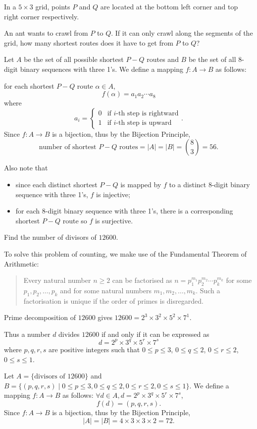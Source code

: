 \begin{exercise}
In a $5\times3$ grid, points $P$ and $Q$ are located at the bottom left corner and top right corner respectively.

An ant wants to crawl from $P$ to $Q$. If it can only crawl along the segments of the grid, how many shortest routes does it have to get from $P$ to $Q$?
\end{exercise}

\begin{solution}
Let $A$ be the set of all possible shortest $P-Q$ routes and $B$ be the set of all 8-digit binary sequences with three 1's. We define a mapping $f:A\to B$ as follows:

for each shortest $P-Q$ route $\alpha\in A$,
\[ f(\alpha)=a_1a_2\cdots a_8 \]
where
\[ a_i=\begin{cases}
0 & \text{if }i\text{-th step is rightward}\\
1 & \text{if }i\text{-th step is upward}
\end{cases}. \]
Since $f:A\to B$ is a bijection, thus by the Bijection Principle,
\[ \text{number of shortest }P-Q\text{ routes}=|A|=|B|=\binom{8}{3}=56. \]

Also note that
\begin{itemize}
\item since each distinct shortest $P-Q$ is mapped by $f$ to a distinct 8-digit binary sequence with three 1's, $f$ is injective;
\item for each 8-digit binary sequence with three 1's, there is a corresponding shortest $P-Q$ route so $f$ is surjective.
\end{itemize}
\end{solution}

\begin{exercise}
Find the number of divisors of $12600$.
\end{exercise}

\begin{solution}
To solve this problem of counting, we make use of the Fundamental Theorem of Arithmetic:
\begin{quote}
Every natural number $n\ge2$ can be factorised as $n=p_1^{m_1}p_2^{m_2}\cdots p_k^{m_k}$ for some $p_1,p_2,\dots,p_k$ and for some natural numbers $m_1,m_2,\dots,m_k$. Such a factorisation is unique if the order of primes is disregarded.
\end{quote}
Prime decomposition of $12600$ gives $12600=2^3\times3^2\times5^2\times7^1$.

Thus a number $d$ divides $12600$ if and only if it can be expressed as
\[ d=2^p\times3^q\times5^r\times7^s \]
where $p,q,r,s$ are positive integers such that $0\le p\le 3$, $0\le q\le 2$, $0\le r\le 2$, $0\le s\le 1$.

Let $A=\{\text{divisors of }12600\}$ and $B=\{(p,q,r,s)\mid 0\le p\le 3, 0\le q\le 2, 0\le r\le 2, 0\le s\le 1\}$. We define a mapping $f:A\to B$ as follows: $\forall d\in A,d=2^p\times3^q\times5^r\times7^s$,
\[ f(d)=(p,q,r,s). \]
Since $f:A\to B$ is a bijection, thus by the Bijection Principle,
\[ |A|=|B|=4\times3\times3\times2=72. \]
\end{solution}

